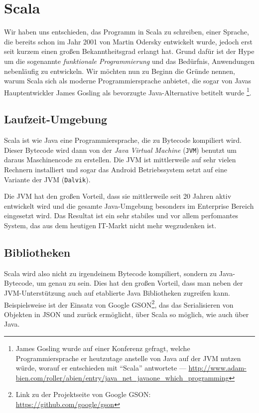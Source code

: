 \chapter{Scala}
Wir haben uns entschieden, das Programm in Scala zu schreiben, einer Sprache, die bereits schon im Jahr 2001 von Martin Odersky entwickelt wurde, jedoch erst seit kurzem einen großen Bekanntheitsgrad erlangt hat. Grund dafür ist der Hype um die sogenannte \textit{funktionale Programmierung} und das Bedürfnis, Anwendungen nebenläufig zu entwickeln.
Wir möchten nun zu Beginn die Gründe nennen, warum Scala sich als moderne Programmiersprache anbietet, die sogar von Javas Hauptentwickler James Gosling als bevorzugte Java-Alternative betitelt wurde \footnote{James Gosling wurde auf einer Konferenz gefragt, welche Programmiersprache er heutzutage anstelle von Java auf der JVM nutzen würde, worauf er entschieden mit ``Scala'' antwortete --- \url{http://www.adam-bien.com/roller/abien/entry/java_net_javaone_which_programming}}.

\section{Laufzeit-Umgebung}
Scala ist wie Java eine Programmiersprache, die zu Bytecode kompiliert wird. Dieser Bytecode wird dann von der \textit{Java Virtual Machine} (\texttt{JVM}) benutzt um daraus Maschinencode zu erstellen. Die JVM ist mittlerweile auf sehr vielen Rechnern installiert und sogar das Android Betriebssystem setzt auf eine Variante der JVM (\texttt{Dalvik}).

Die JVM hat den großen Vorteil, dass sie mittlerweile seit 20 Jahren aktiv entwickelt wird und die gesamte Java-Umgebung besonders im Enterprise Bereich eingesetzt wird. Das Resultat ist ein sehr stabiles und vor allem perfomantes System, das aus dem heutigen IT-Markt nicht mehr wegzudenken ist.

\section{Bibliotheken}
Scala wird also nicht zu irgendeinem Bytecode kompiliert, sondern zu Java-Bytecode, um genau zu sein. Dies hat den großen Vorteil, dass man neben der JVM-Unterstützung auch auf etablierte Java Bibliotheken zugreifen kann. Beispielsweise ist der Einsatz von Google GSON\footnote{Link zu der Projektseite von Google GSON: \url{https://github.com/google/gson}}, das das Serialisieren von Objekten in JSON und zurück ermöglicht, über Scala so möglich, wie auch über Java.

